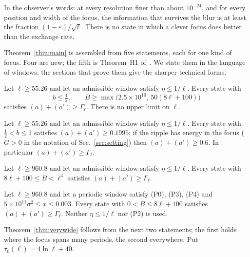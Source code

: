 In the observer's words: at every resolution finer than about $10^{-24}$, and for every position and width of the focus, the information that survives the blur is at least the fraction $(1-\bar\varepsilon)/\sqrt\ell$.
There is no state in which a clever focus does better than the exchange rate.

Theorem~\ref{thm:main} is assembled from five statements, each for one kind of focus.
Four are new; the fifth is Theorem~H1 of~\cite{H}.
We state them in the language of windows; the sections that prove them give the sharper technical forms.

\begin{theorem} 
\label{thm:narrow}
Let $\ell\ge55.26$ and let an admissible window satisfy $\eta\le1/\ell$.
Every state with
\begin{equation}
b\le\tfrac12,\qquad B\ge\max\bigl(2.5\times10^{10},\,50(8\ell+100)\bigr)
\end{equation}
satisfies $(a)+(a')\ge\Gamma_\ell$.
There is no upper limit on $\ell$.
\end{theorem}

\begin{theorem} \proofst
\label{thm:res}
Let $\ell\ge55.26$ and let an admissible window satisfy $\eta\le1/\ell$.
Every state with $\tfrac12<b\le1$ satisfies $(a)+(a')\ge0.1995$; if the ripple has energy in the focus ($G>0$ in the notation of Sec.~\ref{sec:setting}) then $(a)+(a')\ge0.6$.
In particular $(a)+(a')\ge\Gamma_\ell$.
\end{theorem}

\begin{theorem} 
\label{thm:wide}
Let $\ell\ge960.8$ and let an admissible window satisfy $\eta\le1/\ell$.
Every state with $8\ell+100\le B<\ell^4$ satisfies $(a)+(a')\ge\Gamma_\ell$.
\end{theorem}

\begin{theorem} \proofst
\label{thm:verywide}
Let $\ell\ge960.8$ and let a periodic window satisfy (P0), (P3), (P4) and $5\times10^{11}\sigma^2\le x\le0.003$.
Every state with $0<B\le8\ell+100$ satisfies $(a)+(a')\ge\Gamma_\ell$.
Neither $\eta\le1/\ell$ nor (P2) is used.
\end{theorem}

Theorem~\ref{thm:verywide} follows from the next two statements; the first holds where the focus spans many periods, the second everywhere.
Put $\tau_0(\ell)=4\ln\ell+40$.

